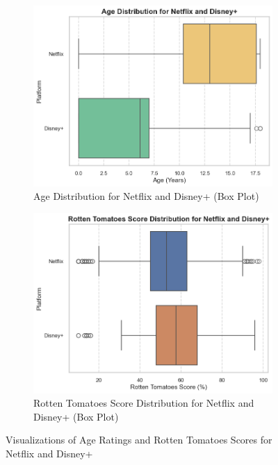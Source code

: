 \documentclass[a4paper, 12pt]{article}
\begin{document}
\begin{figure}[H]
    \begin{subfigure}[t]{0.48\textwidth}
        \centering
        \includegraphics[width=\textwidth]{box_age.png}
        \caption{Age Distribution for Netflix and Disney+ (Box Plot)}
        \label{fig:box_age}
    \end{subfigure}
    \hfill
    \begin{subfigure}[t]{0.48\textwidth}
        \centering
        \includegraphics[width=\textwidth]{box_tomate.png}
        \caption{Rotten Tomatoes Score Distribution for Netflix and Disney+ (Box Plot)}
        \label{fig:box_tomato}
    \end{subfigure}

    \caption{Visualizations of Age Ratings and Rotten Tomatoes Scores for Netflix and Disney+}
    \label{fig:age_tomato_plots}
\end{figure}
\end{document}
